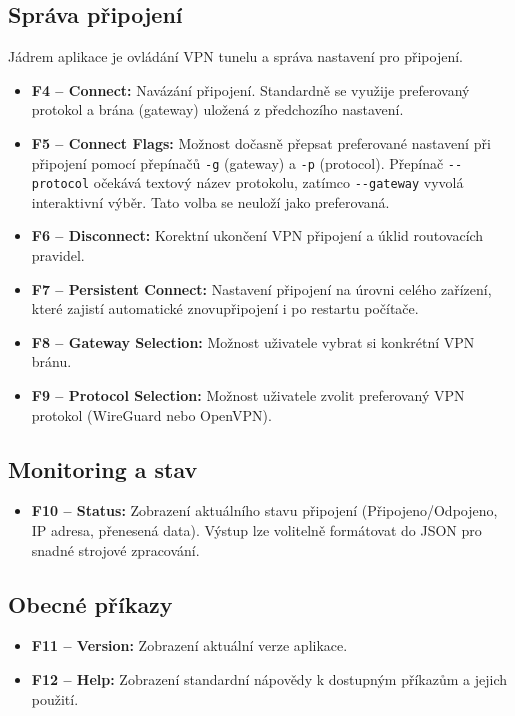 \subsection{Správa připojení}
Jádrem aplikace je ovládání VPN tunelu a správa nastavení pro připojení.
\begin{itemize}
    \item \textbf{F4 -- Connect:} Navázání připojení. Standardně se využije preferovaný protokol a brána (gateway) uložená z předchozího nastavení.
    \item \textbf{F5 -- Connect Flags:} Možnost dočasně přepsat preferované nastavení při připojení pomocí přepínačů \texttt{-g} (gateway) a \texttt{-p} (protocol). Přepínač \texttt{-{}-protocol} očekává textový název protokolu, zatímco \texttt{-{}-gateway} vyvolá interaktivní výběr. Tato volba se neuloží jako preferovaná.
    \item \textbf{F6 -- Disconnect:} Korektní ukončení VPN připojení a úklid routovacích pravidel.
    \item \textbf{F7 -- Persistent Connect:} Nastavení připojení na úrovni celého zařízení, které zajistí automatické znovupřipojení i po restartu počítače.
    \item \textbf{F8 -- Gateway Selection:} Možnost uživatele vybrat si konkrétní VPN bránu.
    \item \textbf{F9 -- Protocol Selection:} Možnost uživatele zvolit preferovaný VPN protokol (WireGuard nebo OpenVPN).
\end{itemize}

\subsection{Monitoring a stav}
\begin{itemize}
    \item \textbf{F10 -- Status:} Zobrazení aktuálního stavu připojení (Připojeno/Odpojeno, IP adresa, přenesená data). Výstup lze volitelně formátovat do JSON pro snadné strojové zpracování.
\end{itemize}

\subsection{Obecné příkazy}
\begin{itemize}
    \item \textbf{F11 -- Version:} Zobrazení aktuální verze aplikace.
    \item \textbf{F12 -- Help:} Zobrazení standardní nápovědy k dostupným příkazům a jejich použití.
\end{itemize}

